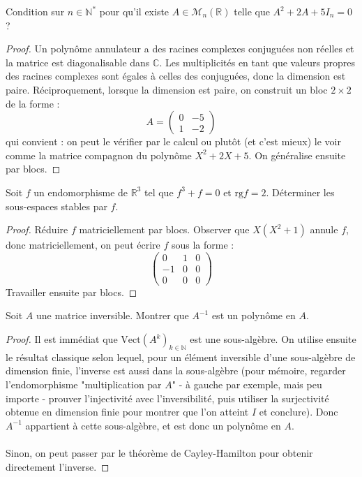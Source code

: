 \documentclass[french,a4paper]{article}
\newcommand{\N}{\mathbb{N}}
\newcommand{\R}{\mathbb{R}}
\newcommand{\C}{\mathbb{C}}
\newcommand{\st}{^*}
\newcommand{\inv}{^{-1}}
\theoremstyle{plain}
\theoremstyle{definition}
\theoremstyle{remark}
\begin{document}
\begin{ex}{}
	Condition sur $n\in\N\st$ pour qu'il existe $A\in\mathcal{M}_n(\R)$ telle que $A^2+2A+5I_n=0$ ?
\end{ex}
\begin{proof}
	Un polynôme annulateur a des racines complexes conjuguées non réelles et la matrice est diagonalisable dans $\C$. Les multiplicités en tant que valeurs propres des racines complexes sont égales à celles des conjuguées, donc la dimension est paire. Réciproquement, lorsque la dimension est paire, on construit un bloc $2\times 2$ de la forme : $$A=\begin{pmatrix}
		0&-5\\
		1&-2
	\end{pmatrix}$$ qui convient : on peut le vérifier par le calcul ou plutôt (et c'est mieux) le voir comme la matrice compagnon du polynôme $X^2+2X+5$. On généralise ensuite par blocs.
\end{proof}

\begin{ex}{}
	Soit $f$ un endomorphisme de $\R^3$ tel que $f^3+f=0$ et $\text{rg}f=2$. Déterminer les sous-espaces stables par $f$.
\end{ex}
\begin{proof}
	Réduire $f$ matriciellement par blocs. Observer que $X(X^2+1)$ annule $f$, donc matriciellement, on peut écrire $f$ sous la forme : $$\begin{pmatrix}
		0&1&0\\
		-1&0&0\\
		0&0&0
	\end{pmatrix}$$ Travailler ensuite par blocs.
\end{proof}

\begin{ex}{}
	Soit $A$ une matrice inversible. Montrer que $A\inv$ est un polynôme en $A$.
\end{ex}
\begin{proof}
	Il est immédiat que $\text{Vect}(A^k)_{k\in\N}$ est une sous-algèbre. On utilise ensuite le résultat classique selon lequel, pour un élément inversible d'une sous-algèbre de dimension finie, l'inverse est aussi dans la sous-algèbre (pour mémoire, regarder l'endomorphisme "multiplication par $A$" - à gauche par exemple, mais peu importe - prouver l'injectivité avec l'inversibilité, puis utiliser la surjectivité obtenue en dimension finie pour montrer que l'on atteint $I$ et conclure). Donc $A\inv$ appartient à cette sous-algèbre, et est donc un polynôme en $A$. \\ \\ Sinon, on peut passer par le théorème de Cayley-Hamilton pour obtenir directement l'inverse.
\end{proof}
\end{document}
